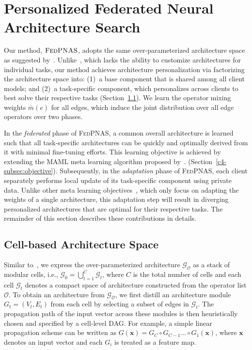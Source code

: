 \label{app:nas}
\section{Personalized Federated Neural Architecture Search}
\label{c4-sec:method}
Our method, $\textsc{FedPNAS}$, adopts the same over-parameterized architecture space as suggested by~\citet{hu2020}. Unlike~\citep{hu2020}, which lacks the ability to customize architectures for individual tasks, our method achieves architecture personalization via factorizing the architecture space into: (1)~a base component that is shared among all client models; and (2)~a task-specific component, which personalizes across clients to best solve their respective tasks (Section~\ref{c4-subsec:archspace}). We learn the operator mixing weights $\bar{m}(e)$ for all edges, which induce the joint distribution over all edge operators over two phases. 

In the \emph{federated} phase of \textsc{FedPNAS}, a common overall architecture is learned such that all task-specific architectures can be quickly and optimally derived from it with minimal fine-tuning efforts. This learning objective is achieved by extending the MAML meta learning algorithm proposed by~\citet{Finn17}. (Section~\ref{c4-subsec:objective}). Subsequently, in the \emph{adaptation} phase of \textsc{FedPNAS}, each client separately performs local update of its task-specific component using private data. Unlike other meta learning objectives~\citep{Finn17}, which only focus on adapting the weights of a single architecture, this adaptation step will result in diverging personalized architectures that are optimal for their respective tasks. The remainder of this section describes these contributions in details.


\subsection{Cell-based Architecture Space}
\label{c4-subsec:archspace}
Similar to~\citet{hu2020}, we express the over-parameterized architecture $\mathcal{G_O}$ as a stack of modular cells, i.e., $\mathcal{G}_0 = \bigcup_{t=1}^C \mathcal{G}_t$, where $C$ is the total number of cells and each cell $\mathcal{G}_t$ denotes a compact space of architecture constructed from the operator list $\mathcal{O}$. To obtain an architecture from $\mathcal{G_O}$, we first distill an architecture module $G_t = (V_t, E_t)$ from each cell by selecting a subset of edges in $\mathcal{G}_t$. The propagation path of the input vector across these modules is then heuristically chosen and specified by a cell-level DAG. For example, a simple linear propagation scheme can be written as $G(\mathbf{x}) = G_C \circ G_{C-1} \dots \circ G_1(\mathbf{x})$, where $\mathbf{x}$ denotes an input vector and each $G_i$ is treated as a feature map.

